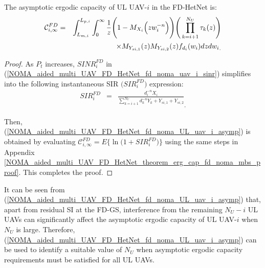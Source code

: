 \begin{corollary} \label{NOMA_aided_multi_UAV_FD_HetNet_corollary_erg_cap_fd_noma_UL_uav_i}
The asymptotic ergodic capacity of UL UAV-$i$ in the FD-HetNet is:
\begin{eqnarray} \label{NOMA_aided_multi_UAV_FD_HetNet_fd_noma_UL_uav_i_asymp}
\mathcal{C}_{i,\infty}^{FD} & \hspace{-0.0cm} = & \hspace{-0.0cm} \int_{L_{m,i}}^{L_{p,i}} \int_{0}^{\infty} \frac{1}{z} \Bigg(1-M_{X_{i}}\Big(z w_{i}^{-n}\Big)\Bigg) \Bigg( \prod_{k=i+1}^{N_U} \tau_k(z) \Bigg) \nonumber \\
 & & \hspace{1.3cm} \times M_{Y_{si,1}}(z) M_{Y_{si,2}}(z) f_{d_{i}}(w_{i}) {dz dw_{i}}_.
\end{eqnarray}
\end{corollary}
\begin{proof}
As $P_t $ increases, $SINR_{i}^{FD}$ in (\ref{NOMA_aided_multi_UAV_FD_HetNet_fd_noma_uav_i_sinr}) simplifies into the following instantaneous SIR $\big(SIR_{i}^{FD}\big)$ expression:
\begin{eqnarray} \label{NOMA_aided_multi_UAV_FD_HetNet_fd_noma_uav_i_sir}
SIR_{i}^{FD} & = & \frac{d_{i}^{-n} X_i}{\sum_{k=i+1}^{N_U} d_k^{-n} Y_k + Y_{si,1} + Y_{si,2}}_,
\end{eqnarray}

Then, (\ref{NOMA_aided_multi_UAV_FD_HetNet_fd_noma_UL_uav_i_asymp}) is obtained by evaluating $\mathcal{C}_{i,\infty}^{FD} = E\Big\{\ln\Big(1+SIR_{i}^{FD}\Big)\Big\}$ using the same steps in Appendix \ref{NOMA_aided_multi_UAV_FD_HetNet_theorem_erg_cap_fd_noma_mbs_proof}. This completes the proof.
\end{proof}

It can be seen from (\ref{NOMA_aided_multi_UAV_FD_HetNet_fd_noma_UL_uav_i_asymp}) that, apart from residual SI at the FD-GS, interference from the remaining $N_U - i $ UL UAVs can significantly affect the asymptotic ergodic capacity of UL UAV-$i$ when $N_U$ is large. Therefore, (\ref{NOMA_aided_multi_UAV_FD_HetNet_fd_noma_UL_uav_i_asymp}) can be used to identify a suitable value of $N_U$ when asymptotic ergodic capacity requirements must be satisfied for all UL UAVs.

